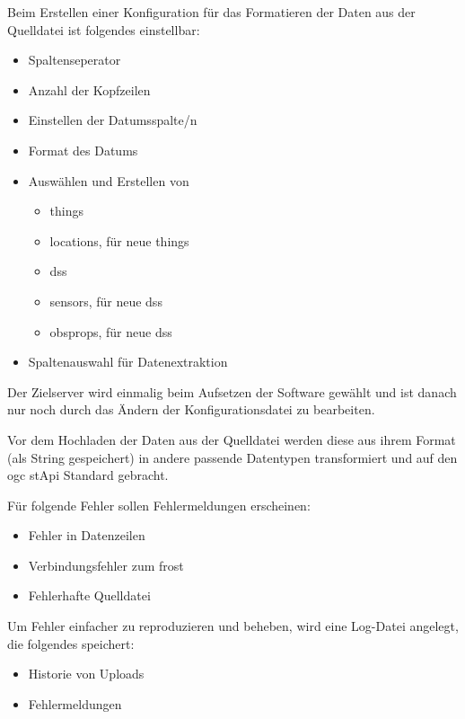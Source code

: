\documentclass[a4paper, 12 pt]{article}
\begin{document}
	Beim Erstellen einer Konfiguration für das Formatieren der Daten aus der Quelldatei ist folgendes einstellbar:
	\begin{itemize}
			\item Spaltenseperator
			\item Anzahl der Kopfzeilen
			\item Einstellen der Datumsspalte/n
			\item Format des Datums
			\item Auswählen und Erstellen von
			\begin{itemize}
				\item \glspl{thing}
				\item \glspl{location}, für neue \glspl{thing}
				\item \glspl{ds}
				\item \gls{sensor}s, für neue \glspl{ds}
				\item \glspl{obsprop}, für neue \glspl{ds}
			\end{itemize}
			\item Spaltenauswahl für Datenextraktion
		\end{itemize}
	
	Der Zielserver wird einmalig beim Aufsetzen der Software gewählt und ist danach nur noch durch das Ändern der Konfigurationsdatei zu bearbeiten.
	
	
	Vor dem Hochladen der Daten aus der Quelldatei werden diese aus ihrem Format (als String gespeichert) in andere passende Datentypen transformiert und auf den \gls{ogc} \gls{stApi} Standard gebracht.
	
	Für folgende Fehler sollen Fehlermeldungen erscheinen:
	\begin{itemize}
			\item Fehler in Datenzeilen
			\item Verbindungsfehler zum \gls{frost}
			\item Fehlerhafte Quelldatei
		\end{itemize}
	
	Um Fehler einfacher zu reproduzieren und beheben, wird eine Log-Datei angelegt, die folgendes speichert:
	\begin{itemize}
			\item Historie von Uploads
			\item Fehlermeldungen
		\end{itemize}
	
\end{document}
